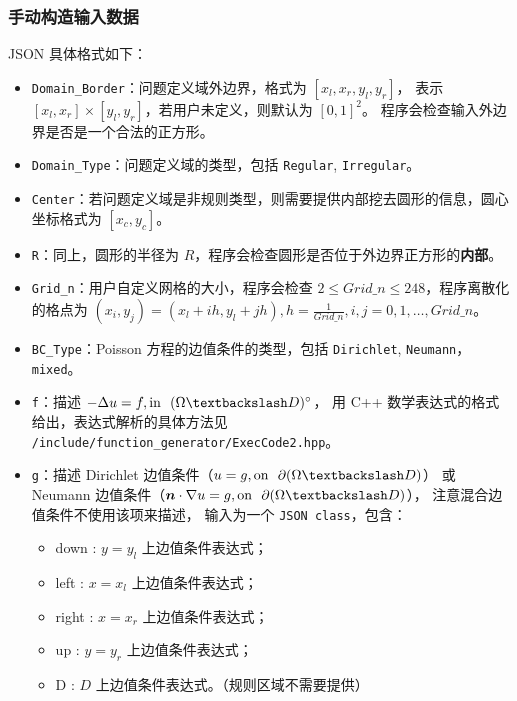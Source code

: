 \documentclass[lang=cn,a4paper,newtx,bibend=bibtex]{elegantpaper}
\begin{document}
\subsubsection{手动构造输入数据}

JSON 具体格式如下：
\begin{itemize}
  \item \lstinline{Domain_Border}：问题定义域外边界，格式为 $[x_l, x_r, y_l, y_r]$，
  表示 $[x_l, x_r] \times [y_l, y_r]$，若用户未定义，则默认为 $[0, 1]^2$。
  程序会检查输入外边界是否是一个合法的正方形。
  \item \lstinline{Domain_Type}：问题定义域的类型，包括 \lstinline{Regular}, \lstinline{Irregular}。
  \item \lstinline{Center}：若问题定义域是非规则类型，则需要提供内部挖去圆形的信息，圆心坐标格式为 $[x_c, y_c]$。
  \item \lstinline{R}：同上，圆形的半径为 $R$，程序会检查圆形是否位于外边界正方形的\textbf{内部}。
  \item \lstinline{Grid_n}：用户自定义网格的大小，程序会检查 $2 \le Grid\_n \le 248$，程序离散化的格点为 $(x_i, y_j) = (x_l + ih, y_l + jh), h = \frac1{Grid\_n}, i, j = 0, 1, \dots, Grid\_n$。
  \item \lstinline{BC_Type}：Poisson 方程的边值条件的类型，包括 \lstinline{Dirichlet}, \lstinline{Neumann}，\lstinline{mixed}。
  \item \lstinline{f}：描述 $- \Delta u = f, \text{in~~} (\Omega \fxg D)^{\circ}$，
                       用 C++ 数学表达式的格式给出，表达式解析的具体方法见 \\
                       \texttt{/include/function\_generator/ExecCode2.hpp}。
  \item \lstinline{g}：描述 Dirichlet 边值条件（$u = g, \text{on~~} \partial  (\Omega \fxg D)$）
                       或 Neumann 边值条件（$\bm{n} \cdot \nabla u = g, \text{on~~} \partial  (\Omega \fxg D)$），
                       注意混合边值条件不使用该项来描述，
                       输入为一个 \texttt{JSON class}，包含：
                       \begin{itemize}[$\circ$]
                        \item down : $y = y_l$ 上边值条件表达式；
                        \item left : $x = x_l$ 上边值条件表达式；
                        \item right : $x = x_r$ 上边值条件表达式；
                        \item up : $y = y_r$ 上边值条件表达式；
                        \item D : $D$ 上边值条件表达式。（规则区域不需要提供）

\end{itemize}
\end{itemize}
\end{document}
